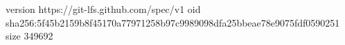 version https://git-lfs.github.com/spec/v1
oid sha256:5f45b2159b8f45170a77971258b97c9989098dfa25bbeae78e9075fdf0590251
size 349692
